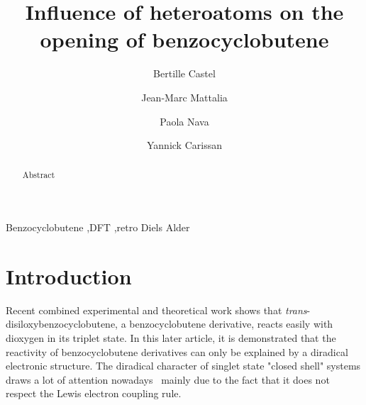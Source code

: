 \documentclass[final,3p,times,twocolumn]{elsarticle}
\newcommand{\trans}{\emph{trans}-disiloxybenzocyclobutene}
\begin{document}
\begin{frontmatter}



\title{Influence of heteroatoms on the opening of benzocyclobutene}

\author{Bertille Castel}
\author{Jean-Marc Mattalia}
\author{Paola Nava}
\author{Yannick Carissan}
\address{Aix Marseille Universit\'e, Centrale Marseille, CNRS,
iSm2 UMR 7313,
13397, Marseille, France}

\begin{abstract}
Abstract
\end{abstract}

\begin{keyword}


Benzocyclobutene \sep DFT \sep retro Diels Alder
\end{keyword}

\end{frontmatter}

\linenumbers

\section{Introduction}
\label{sec:introduction}
Recent combined experimental and theoretical work
shows that \trans{}, a benzocyclobutene
derivative,
reacts easily with dioxygen in its triplet state.\cite{Drujon2014}
In this later article, it is demonstrated that
the reactivity of benzocyclobutene derivatives can only be
explained by a diradical electronic structure.
The diradical character of singlet state "closed shell" systems
draws a lot of attention nowadays~\cite{Abe2013,Hsieh2015}
mainly due to the fact that it does not respect the Lewis electron
coupling rule.\cite{Trinquier2015}
\end{document}
